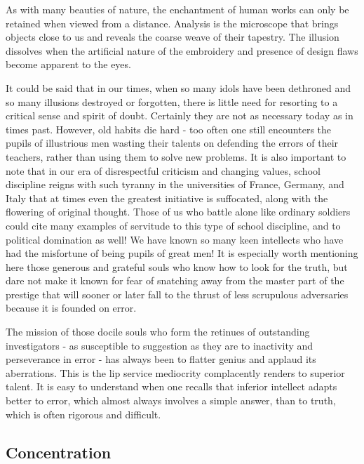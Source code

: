 \documentclass{article}
\begin{document}
As with many beauties of nature, the enchantment of human works can only be retained when viewed from a distance. Analysis is the microscope that brings objects close to us and reveals the coarse weave of their tapestry. The illusion dissolves when the artificial nature of the embroidery and presence of design flaws become apparent to the eyes.

It could be said that in our times, when so many idols have been dethroned and so many illusions destroyed or forgotten, there is little need for resorting to a critical sense and spirit of doubt. Certainly they are not as necessary today as in times past. However, old habits die hard - too often one still encounters the pupils of illustrious men wasting their talents on defending the errors of their teachers, rather than using them to solve new problems. It is also important to note that in our era of disrespectful criticism and changing values, school discipline reigns with such tyranny in the universities of France, Germany, and Italy that at times even the greatest initiative is suffocated, along with the flowering of original thought. Those of us who battle alone like ordinary soldiers could cite many examples of servitude to this type of school discipline, and to political domination as well! We have known so many keen intellects who have had the misfortune of being pupils of great men! It is especially worth mentioning here those generous and grateful souls who know how to look for the truth, but dare not make it known for fear of snatching away from the master part of the prestige that will sooner or later fall to the thrust of less scrupulous adversaries because it is founded on error.

The mission of those docile souls who form the retinues of outstanding investigators - as susceptible to suggestion as they are to inactivity and perseverance in error - has always been to flatter genius and applaud its aberrations. This is the lip service mediocrity complacently renders to superior talent. It is easy to understand when one recalls that inferior intellect adapts better to error, which almost always involves a simple answer, than to truth, which is often rigorous and difficult.

\subsection*{Concentration}
\end{document}
